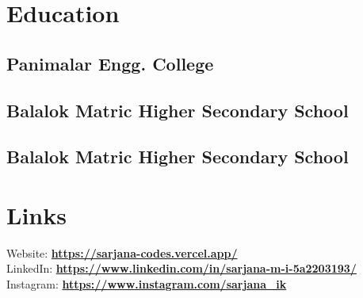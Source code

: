 \documentclass[]{deedy-resume-openfont}
\begin{document}
%
%
\lastupdated

%
%

%
%

\begin{minipage}[t]{0.33\textwidth} 


\section{Education} 

\subsection{Panimalar Engg. College}
\sectionsep

\subsection{Balalok Matric Higher Secondary School}
\sectionsep

\subsection{Balalok Matric Higher Secondary School}
\sectionsep


\section{Links} 
Website: \href{https://sarjana-codes.vercel.app/}{\bf https://sarjana-codes.vercel.app/} \\
\vspace{\topsep}
LinkedIn:  \href{https://www.linkedin.com/in/sarjana-m-i-5a2203193/}{\bf https://www.linkedin.com/in/sarjana-m-i-5a2203193/} \\
\vspace{\topsep}
Instagram:  \href{https://www.instagram.com/sarjana_ik/}{\bf https://www.instagram.com/sarjana_ik}\\


\end{minipage}
\end{document}
